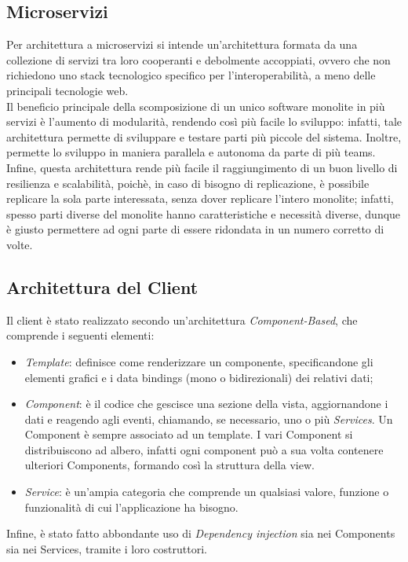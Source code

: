 \subsection{Microservizi}
Per architettura a microservizi si intende un'architettura formata da una collezione di servizi tra loro cooperanti e debolmente accoppiati, ovvero che non richiedono uno stack tecnologico specifico per l'interoperabilità, a meno delle principali tecnologie web. 
\\Il beneficio principale della scomposizione di un unico software monolite in più servizi è l'aumento di modularità, rendendo così più facile lo sviluppo: infatti, tale architettura permette di sviluppare e testare parti più piccole del sistema. Inoltre, permette lo sviluppo in maniera parallela e autonoma da parte di più teams. \\Infine, questa architettura rende più facile il raggiungimento di un buon livello di resilienza e scalabilità,  poichè, in caso di bisogno di replicazione, è possibile replicare la sola parte interessata, senza dover replicare l'intero monolite; infatti, spesso parti diverse del monolite hanno caratteristiche e necessità diverse, dunque è giusto permettere ad ogni parte di essere ridondata in un numero corretto di volte.

\subsection{Architettura del Client}
Il client è stato realizzato secondo un'architettura \textit{Component-Based}, che comprende i seguenti elementi:
\begin{itemize}
    \item \textit{Template}: definisce come renderizzare un componente, specificandone gli elementi grafici e i data bindings (mono o bidirezionali) dei relativi dati;
    \item \textit{Component}: è il codice che gescisce una sezione della vista, aggiornandone i dati e reagendo agli eventi, 
    chiamando, se necessario, uno o più \textit{Services}. Un Component è sempre associato ad un template. 
    I vari Component si distribuiscono ad albero, infatti ogni component può a sua volta contenere ulteriori Components, formando così la struttura della view.
    \item \textit{Service}: è un'ampia categoria che comprende un qualsiasi valore, funzione o funzionalità di cui l'applicazione ha bisogno.
\end{itemize}
Infine, è stato fatto abbondante uso di \textit{Dependency injection} sia nei Components sia nei Services, tramite i loro costruttori.

